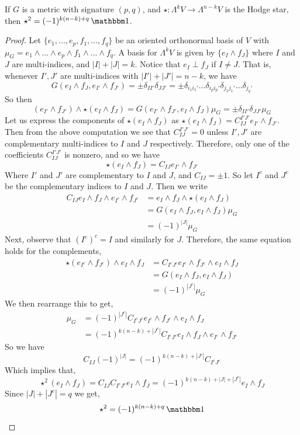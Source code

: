 \begin{thm}
If $G$ is a metric with signature $(p,q)$, and $\star : \Lambda^k V \to \Lambda^{n-k}V$ is the Hodge star, then $\star^2 = (-1)^{k(n-k)+q}\One$.
\end{thm}
\begin{proof}
Let $\{e_1,...,e_p,f_1,...,f_q\}$ be an oriented orthonormal basis of $V$ with $\mu_G = e_1\wedge...\wedge e_p \wedge f_1\wedge...\wedge f_q$. A basis for $\Lambda^k V$ is given by $\{e_I\wedge f_J\}$ where $I$ and $J$ are multi-indices, and $|I|+|J|=k$. Notice that $e_I\perp f_J$ if $I\neq J$. That is, whenever $I',J'$ are multi-indices with $|I'|+|J'| = n-k$, we have
\[G(e_I\wedge f_J,e_{I'}\wedge f_{J'}) = \pm \delta_{II'}\delta_{JJ'} = \pm \delta_{i_1 i_1'}...\delta_{i_p i_p'}\delta_{j_1 j_1'}...\delta_{j_q'}\]
So then
\[(e_{I'}\wedge f_{J'})\wedge \star(e_I\wedge f_J) = G(e_{I'}\wedge f_{J'},e_I\wedge f_J)\mu_G= \pm\delta_{II'}\delta_{JJ'}\mu_G \]
Let us express the components of $\star(e_I\wedge f_J)$ as $\star(e_I \wedge f_J) = C_{IJ}^{I'J'}e_{I'}\wedge f_{J'}$.
Then from the above computation we see that $C_{IJ}^{I'J'} =0$ unless $I',J'$ are complementary multi-indices to $I$ and $J$ respectively. Therefore, only one of the coefficients $C_{IJ}^{I'J'}$ is nonzero, and so we have
\[\star(e_I\wedge f_J) = C_{IJ} e_{I'}\wedge f_{J'}\]
Where $I'$ and $J'$ are complementary to $I$ and $J$, and $C_{IJ}=\pm 1$. So let $I^c$ and $J^c$ be the complementary indices to $I$ and $J$. Then we write
\begin{align*}
    C_{IJ} e_I\wedge f_J \wedge e_{I^c}\wedge f_{J^c}&= e_I\wedge f_J \wedge \star(e_I\wedge f_J)\\
    &= G(e_I\wedge f_J,e_I\wedge f_J)\mu_G\\
    &= (-1)^{|J|}\mu_G
\end{align*}
Next, observe that $(I^c)^c = I$ and similarly for $J$. 
Therefore, the same equation holds for the complements,
\begin{align*}
    \star(e_{I^c}\wedge f_{J^c})\wedge e_I\wedge f_J &= C_{I^c J^c} e_{I^c}\wedge f_{J^c}\wedge e_I\wedge f_J\\
    &= G(e_I \wedge f_J, e_I \wedge f_J) \\
    &= (-1)^{|J^c|}\mu_G
\end{align*}
We then rearrange this to get,
\begin{align*}
    \mu_G &= (-1)^{|J^c|} C_{I^cJ^c}e_{I^c}\wedge f_{J^c}\wedge e_I\wedge f_J\\
    &=(-1)^{k(n-k)+|J^c|}C_{I^cJ^c} e_I\wedge f_J\wedge e_{I^c}\wedge f_{J^c}
\end{align*}
So we have
\[C_{IJ}(-1)^{|J|} = (-1)^{k(n-k)+|J'|}C_{I^c J^c}\]
Which implies that,
\[\star^2(e_I\wedge f_J) = C_{IJ}C_{I^c J^c} e_I\wedge f_J = (-1)^{k(n-k)+|J|+|J^c|}e_I\wedge f_J\]
Since $|J|+|J^c|=q$ we get,
\[\star^2 = (-1)^{k(n-k)+q}\One\]
\end{proof}


